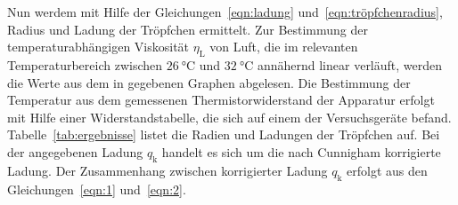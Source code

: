 \documentclass[
  bibliography=totoc,     %
  captions=tableheading,  %
  titlepage=firstiscover, %
]{scrartcl}
\begin{document}
Nun werdem mit Hilfe der Gleichungen~\eqref{eqn:ladung} und~\eqref{eqn:tröpfchenradius}, Radius und Ladung der Tröpfchen ermittelt. Zur Bestimmung der temperaturabhängigen Viskosität $\eta_{\mathup{L}}$ von Luft, die im relevanten Temperaturbereich zwischen $\SI{26}{\celsius}$ und $\SI{32}{\celsius}$ annähernd linear verläuft, werden die Werte aus dem in \cite{anleitung} gegebenen Graphen abgelesen.
 Die Bestimmung der Temperatur aus dem gemessenen Thermistorwiderstand der Apparatur erfolgt mit Hilfe einer Widerstandstabelle, die sich auf einem der Versuchsgeräte befand. Tabelle~\ref{tab:ergebnisse} listet die Radien und Ladungen der Tröpfchen auf. Bei der angegebenen Ladung $q_{\mathup{k}}$ handelt es sich um die nach Cunnigham korrigierte Ladung. Der Zusammenhang zwischen korrigierter Ladung $q_{\mathup{k}}$ erfolgt aus den Gleichungen~\eqref{eqn:1} und~\eqref{eqn:2}.
\end{document}
